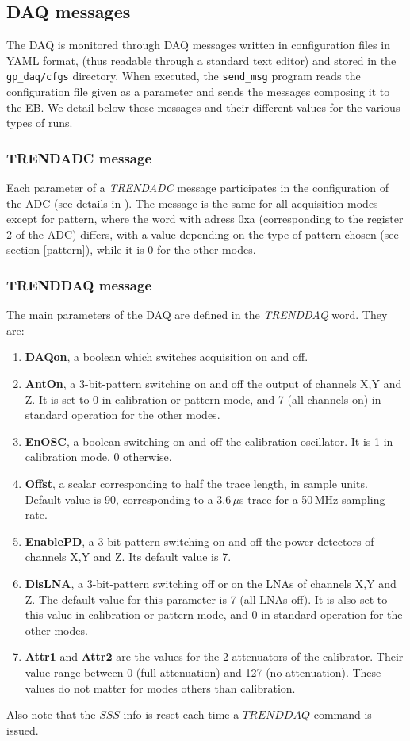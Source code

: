 \subsection{DAQ messages}
\label{config}
The DAQ is monitored through DAQ messages written in configuration files in YAML format, (thus readable through a standard text editor) and stored in the \texttt{gp\_daq/cfgs} directory. When executed, the \texttt{send\_msg} program reads the configuration file given as a parameter and sends the messages composing it to the EB.
We detail below these messages and their different values for the various types of runs. 
%
\subsubsection{TRENDADC message}
Each parameter of a {\it TRENDADC} message participates in the configuration of the ADC (see details in \cite{ADCdoc}). The message is the same for all acquisition modes except for pattern, where the word with adress 0xa (corresponding to the register 2 of the ADC) differs, with a value depending on the type of pattern chosen (see section \ref{pattern}), while it is 0 for the other modes. 
%
\subsubsection{TRENDDAQ message}
\label{TRENDDAQ}
The main  parameters of the DAQ are defined in the {\it TRENDDAQ} word. They are:
\begin{enumerate}[-]
\item{{\bf DAQon}, a boolean which switches acquisition on and off.} 
\item{{\bf AntOn}, a 3-bit-pattern switching on and off the output of channels X,Y and Z. It is set to 0 in calibration or pattern mode, and 7 (all channels on) in standard operation for the other modes.}
\item{{\bf EnOSC}, a boolean switching on and  off the calibration oscillator. It is 1 in calibration mode, 0 otherwise. }
\item{{\bf Offst}, a scalar corresponding to half the trace length, in sample units. Default value is 90, corresponding to a 3.6\,$\mu$s trace for a 50\,MHz sampling rate.}
\item{{\bf EnablePD}, a 3-bit-pattern switching on and off the power detectors of channels X,Y and Z. Its default value is 7.}	
\item{{\bf DisLNA}, a 3-bit-pattern switching off or on the LNAs of channels X,Y and Z.  The default value for this parameter is 7 (all LNAs off). It is also set to this value in calibration or pattern mode, and 0 in standard operation for the other modes. }
\item{{\bf Attr1} and {\bf Attr2} are the values for the 2 attenuators of the calibrator. Their value range between 0 (full attenuation) and 127 (no attenuation). These values do not matter for modes others than calibration.} 
\end{enumerate}
Also note that the $SSS$ info is reset each time a $TRENDDAQ$ command is issued.

